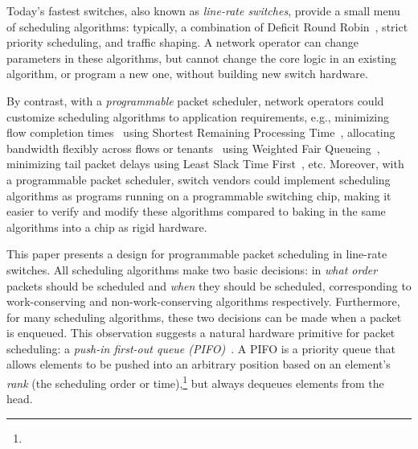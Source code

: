 
Today's fastest switches, also known as \textit{line-rate switches},
provide a small menu of scheduling algorithms: typically, a
combination of Deficit Round Robin~\cite{drr}, strict priority
scheduling, and traffic shaping. A network operator can change
parameters in these algorithms, but cannot change the core logic in an
existing algorithm, or program a new one, without building new switch
hardware.

By contrast, with a {\em programmable} packet scheduler, network
operators could customize scheduling algorithms to application
requirements, e.g., minimizing flow completion times~\cite{pFabric}
using Shortest Remaining Processing Time~\cite{srpt}, allocating
bandwidth flexibly across flows or tenants~\cite{eyeq, faircloud}
using Weighted Fair Queueing~\cite{wfq}, minimizing tail packet delays
using Least Slack Time First~\cite{lstf}, etc. Moreover, with a
programmable packet scheduler, switch vendors could implement
scheduling algorithms as programs running on a programmable switching
chip, making it easier to verify and modify these algorithms compared to
baking in the same algorithms into a chip as rigid hardware.

This paper presents a design for programmable packet scheduling in
line-rate switches. All scheduling algorithms make two basic
decisions: in {\em what order} packets should be scheduled and {\em
  when} they should be scheduled, corresponding to work-conserving
and non-work-conserving algorithms respectively.  Furthermore, for many scheduling
algorithms, these two decisions can be made when a packet is
enqueued. 
This observation suggests a natural hardware primitive for packet
scheduling: a {\em push-in first-out queue
  (PIFO)}~\cite{pifo,pifo_hotnets}. A PIFO is a priority queue that
allows elements to be pushed into an arbitrary position based on an
element's {\em rank} (the scheduling order or time),\footnote{} but always dequeues elements from the head.


